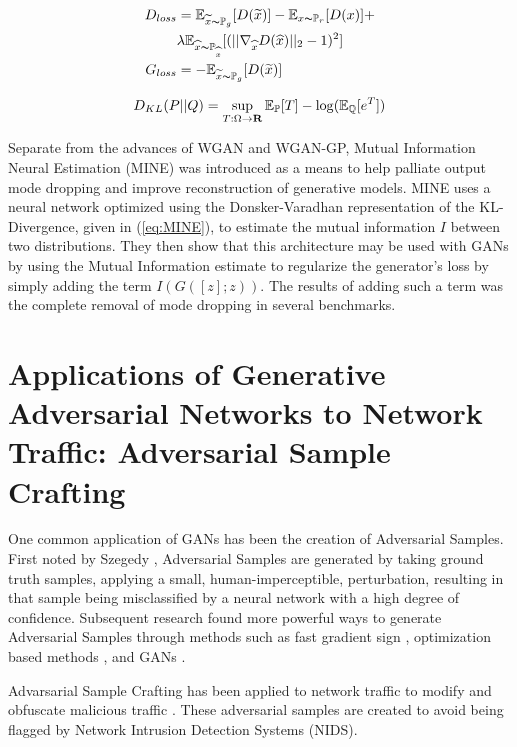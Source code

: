 \begin{align}
	D_{loss} &=  \mathbb{E}_{\widetilde{x} \thicksim \mathbb{P}_g}[D(\widetilde{x})] - \mathbb{E}_{x \thicksim \mathbb{P}_r}[D(x)] + \label{eq:WGAN-GP1} \\
	& \lambda \mathbb{E}_{\widehat{x} \thicksim \mathbb{P}_{\widehat{x}}}[(||\nabla_{\widehat{x}} D(\widehat{x})||_2 -1)^2] \label{eq:WGAN-GP2}\\
	G_{loss} &=  -\mathbb{E}_{\widetilde{x} \thicksim \mathbb{P}_g}[D(\widetilde{x})] \label{eq:WGAN-GP3}
\end{align}

\begin{equation}
	D_{KL}(P||Q) = \sup\limits_{T:\Omega \rightarrow \mathbf{R}} \mathbb{E}_{\mathbb{P}}[T] - \log(\mathbb{E}_{\mathbb{Q}}[e^T])
	\label{eq:MINE}
\end{equation}

Separate from the advances of WGAN and WGAN-GP, Mutual Information Neural Estimation (MINE) \cite{Belghazi2018} was introduced as a means to help palliate output mode dropping and improve reconstruction of generative models. MINE uses a neural network optimized using the Donsker-Varadhan representation of the KL-Divergence, given in (\ref{eq:MINE}), to estimate the mutual information $I$ between two distributions. They then show that this architecture may be used with GANs by using the Mutual Information estimate to regularize the generator's loss by simply adding the term $I(G([z];z))$. The results of adding such a term was the complete removal of mode dropping in several benchmarks.

\section{Applications of Generative Adversarial Networks to Network Traffic: Adversarial Sample Crafting}

One common application of GANs has been the creation of Adversarial Samples. First noted by Szegedy \etal \cite{Szegedy2013}, Adversarial Samples are generated by taking ground truth samples, applying a small, human-imperceptible, perturbation, resulting in that sample being misclassified by a neural network with a high degree of confidence. Subsequent research found more powerful ways to generate Adversarial Samples through methods such as fast gradient sign \cite{Goodfellow2015}, optimization based methods \cite{Carlini2017, Liu2017, Eykholt2018}, and GANs \cite{Xiao2018}. 

Advarsarial Sample Crafting has been applied to network traffic to modify and obfuscate malicious traffic \cite{Rigaki2018, Lin2018, Hu2017, Anderson2017}. These adversarial samples are created to avoid being flagged by Network Intrusion Detection Systems (NIDS).

